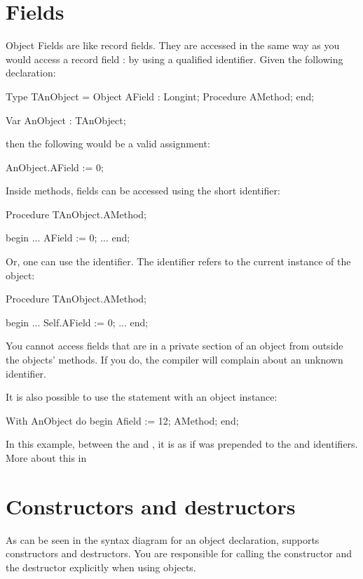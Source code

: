 \documentclass{report}
\begin{document}
\section{Fields}

Object Fields are like record fields. They are accessed in the same way as
you would access a record field : by using a qualified identifier. Given the
following declaration:
\begin{listing}
Type TAnObject = Object
       AField : Longint;
       Procedure AMethod;
       end;

Var AnObject : TAnObject;
\end{listing}
then the following would be a valid assignment:
\begin{listing}
  AnObject.AField := 0;
\end{listing}

Inside methods, fields can be accessed using the short identifier:
\begin{listing}
Procedure TAnObject.AMethod;

begin
  ...
  AField := 0;
  ...
end;
\end{listing}
Or, one can use the  identifier. The  identifier refers
to the current instance of the object:
\begin{listing}
Procedure TAnObject.AMethod;

begin
  ...
  Self.AField := 0;
  ...
end;
\end{listing}

You cannot access fields that are in a private section of an object from
outside the objects' methods. If you do, the compiler will complain about
an unknown identifier.

It is also possible to use the  statement with an object instance:
\begin{listing}
With AnObject do
  begin
  Afield := 12;
  AMethod;
  end;
\end{listing}
In this example, between the  and , it is as if
 was prepended to the  and 
identifiers. More about this in 

\section{Constructors and destructors }
\label{se:constructdestruct}

As can be seen in the syntax diagram for an object declaration, \fpc supports
constructors and destructors. You are responsible for calling the 
constructor and the destructor explicitly when using objects.
\end{document}
